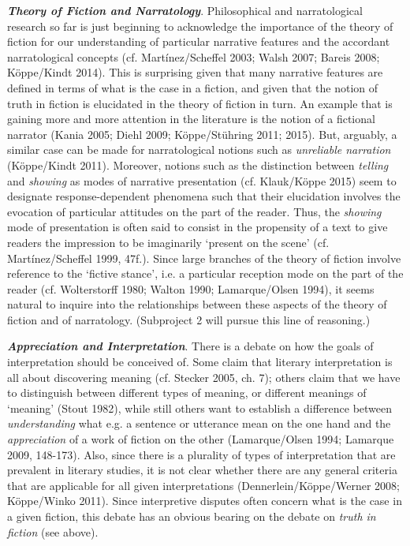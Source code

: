 \vspace{.2cm}
\noindent\textbf{\emph{Theory of Fiction and Narratology}}. Philosophical and
narratological research so far is just beginning to acknowledge the
importance of the theory of fiction for our understanding of particular
narrative features and the accordant narratological concepts (cf.
Mart\'inez/Scheffel 2003; Walsh 2007; Bareis 2008; K\"oppe/Kindt 2014). This
is surprising given that many narrative features are defined in terms of
what is the case in a fiction, and given that the notion of truth in
fiction is elucidated in the theory of fiction in turn. An example that
is gaining more and more attention in the literature is the notion of a
fictional narrator (Kania 2005; Diehl 2009; K\"oppe/St\"uhring 2011; 2015).
But, arguably, a similar case can be made for narratological notions
such as \emph{unreliable narration} (K\"oppe/Kindt 2011). Moreover,
notions such as the distinction between \emph{telling} and
\emph{showing} as modes of narrative presentation (cf. Klauk/K\"oppe 2015)
seem to designate response-dependent phenomena such that their
elucidation involves the evocation of particular attitudes on the part
of the reader. Thus, the \emph{showing} mode of presentation is often
said to consist in the propensity of a text to give readers the
impression to be imaginarily `present on the scene' (cf.
Mart\'inez/Scheffel 1999, 47f.). Since large branches of the theory of
fiction involve reference to the `fictive stance', i.e. a particular
reception mode on the part of the reader (cf. Wolterstorff 1980; Walton
1990; Lamarque/Olsen 1994), it seems natural to inquire into the
relationships between these aspects of the theory of fiction and of
narratology. (Subproject 2 will pursue this line of reasoning.)

\vspace{.2cm}
\noindent\textbf{\emph{Appreciation and Interpretation}}. There is a debate on how the goals of interpretation should be conceived of. Some claim that literary interpretation is all about discovering meaning (cf. Stecker 2005, ch. 7); others claim that we have to distinguish between different types of meaning, or different meanings of `meaning' (Stout 1982), while still others want to establish a difference between \emph{understanding} what e.g. a sentence or utterance mean on the one hand and the \emph{appreciation} of a work of fiction on the other (Lamarque/Olsen 1994; Lamarque 2009, 148-173). Also, since there is a plurality of types of interpretation that are prevalent in literary studies, it is not clear whether there are any general criteria that are applicable for all given interpretations (Dennerlein/K\"oppe/Werner 2008; K\"oppe/Winko 2011). Since interpretive disputes often concern what is the case in a given fiction, this debate has an obvious bearing on the debate on \emph{truth in fiction} (see above).
